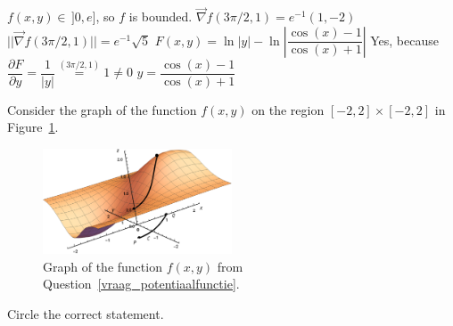 \begin{Answer}

\Question $f(x,y) \in \, ]0,e]$, so $f$ is bounded.
\Question $\vec{\nabla} f \left(3\pi/2,1\right) = e^{-1} (1,-2)$
\Question $||\vec{\nabla} f \left(3\pi/2,1\right)|| = e^{-1} \sqrt{5}$
\Question $F(x,y) = \ln |y| - \ln \left| \dfrac{\cos(x) - 1}{\cos(x) + 1} \right|$
\Question Yes, because $\dfrac{\partial F}{\partial y} = \dfrac{1}{|y|} \stackrel{\left(3\pi/2,1\right)}{=} 1 \neq 0$
\Question $y = \dfrac{\cos(x) - 1}{\cos(x) + 1}$

\end{Answer}


\begin{Exercise} %
Consider the graph of the function $f(x,y)$ on the region \linebreak $[-2,2]\times[-2,2]$ in Figure~\ref{potentiaalfunctie}. \label{vraag_potentiaalfunctie}
	 \begin{figure}[H]
		\centering
		\centerline{
			\includegraphics[width=0.50\textwidth]{potentiaalfunctie.pdf}
		}
		\caption{Graph of the function $f(x,y)$ from Question~\ref{vraag_potentiaalfunctie}.}
		\label{potentiaalfunctie}
	\end{figure}
Circle the correct statement.


\end{Exercise}
